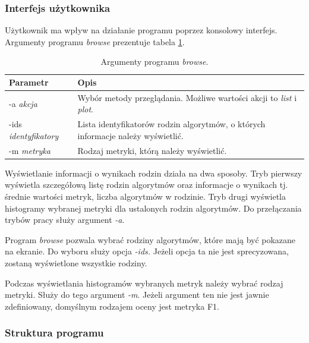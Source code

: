 \documentclass[../thesis.tex]{subfiles}
\begin{document}
\subsubsection{Interfejs użytkownika}

Użytkownik ma wpływ na działanie programu poprzez konsolowy interfejs. Argumenty programu \emph{browse} prezentuje tabela \ref{proj:table_browse_args}.

\begin{table}[h]
\begin{center}
\begin{tabular}{ | l | p{110mm} | }
\hline
\rowcolor{lightgray} Parametr & Opis \\\hline

-a \emph{akcja} & Wybór metody przeglądania. Możliwe wartości akcji to \emph{list} i \emph{plot}.\\\hline
-ids \emph{identyfikatory} & Lista identyfikatorów rodzin algorytmów, o których informacje należy wyświetlić.\\\hline
-m \emph{metryka} & Rodzaj metryki, którą należy wyświetlić.\\\hline

\end{tabular}
\caption{Argumenty programu \emph{browse}.}
\label{proj:table_browse_args}
\end{center}
\end{table}

Wyświetlanie informacji o wynikach rodzin działa na dwa sposoby. Tryb pierwszy wyświetla szczegółową listę rodzin algorytmów oraz informacje o wynikach tj. średnie wartości metryk, liczba algorytmów w rodzinie. Tryb drugi wyświetla histogramy wybranej metryki dla ustalonych rodzin algorytmów. Do przełączania trybów pracy służy argument \emph{-a}.

Program \emph{browse} pozwala wybrać rodziny algorytmów, które mają być pokazane na ekranie. Do wyboru służy opcja \emph{-ids.} Jeżeli opcja ta nie jest sprecyzowana, zostaną wyświetlone wszystkie rodziny.

Podczas wyświetlania histogramów wybranych metryk należy wybrać rodzaj metryki. Służy do tego argument \emph{-m}. Jeżeli argument ten nie jest jawnie zdefiniowany, domyślnym rodzajem oceny jest metryka F1.

\subsubsection{Struktura programu}
\end{document}
